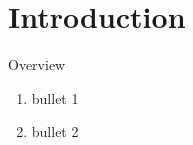 \section{Introduction}
\begin{frame}{Overview}
    \begin{enumerate}
           \item bullet 1
    \pause \item bullet 2
    \end{enumerate}
\end{frame}
